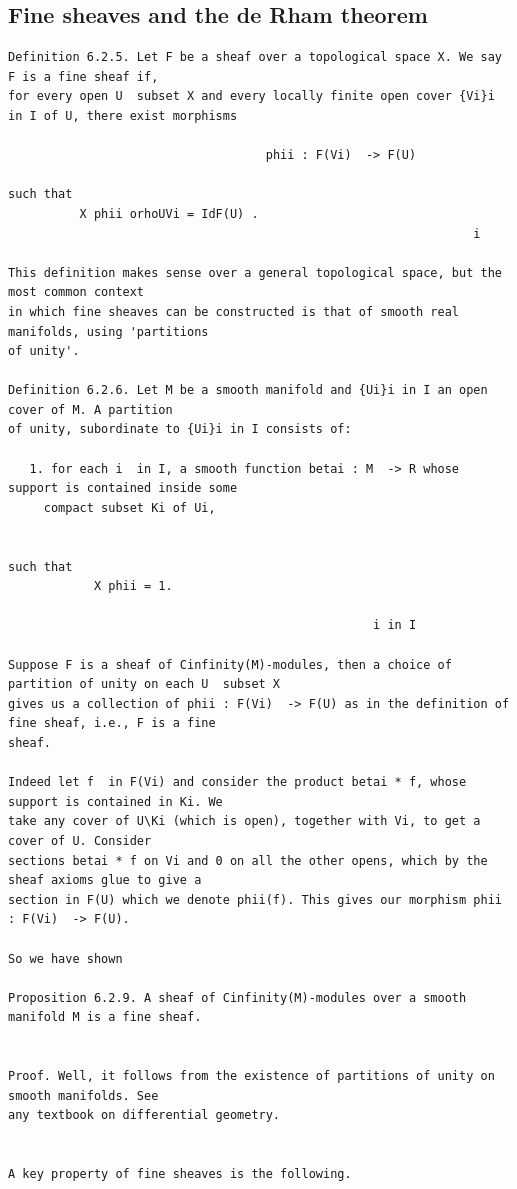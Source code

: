 \subsection{Fine sheaves and the de Rham theorem}
\label{subsection-jethro-cech-4}
\begin{Verbatim}[fontsize=\footnotesize]
Definition 6.2.5. Let F be a sheaf over a topological space X. We say F is a fine sheaf if,
for every open U  subset X and every locally finite open cover {Vi}i in I of U, there exist morphisms

                                    phii : F(Vi)  -> F(U)

such that
          X phii orhoUVi = IdF(U) .
                                                                 i

This definition makes sense over a general topological space, but the most common context
in which fine sheaves can be constructed is that of smooth real manifolds, using 'partitions
of unity'.

Definition 6.2.6. Let M be a smooth manifold and {Ui}i in I an open cover of M. A partition
of unity, subordinate to {Ui}i in I consists of:

   1. for each i  in I, a smooth function betai : M  -> R whose support is contained inside some
     compact subset Ki of Ui,


such that
            X phii = 1.

                                                   i in I

Suppose F is a sheaf of Cinfinity(M)-modules, then a choice of partition of unity on each U  subset X
gives us a collection of phii : F(Vi)  -> F(U) as in the definition of fine sheaf, i.e., F is a fine
sheaf.

Indeed let f  in F(Vi) and consider the product betai * f, whose support is contained in Ki. We
take any cover of U\Ki (which is open), together with Vi, to get a cover of U. Consider
sections betai * f on Vi and 0 on all the other opens, which by the sheaf axioms glue to give a
section in F(U) which we denote phii(f). This gives our morphism phii : F(Vi)  -> F(U).

So we have shown

Proposition 6.2.9. A sheaf of Cinfinity(M)-modules over a smooth manifold M is a fine sheaf.


Proof. Well, it follows from the existence of partitions of unity on smooth manifolds. See
any textbook on differential geometry.


A key property of fine sheaves is the following.


\end{Verbatim}
